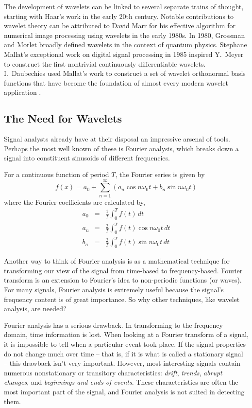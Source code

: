 \documentclass[a4paper,11pt]{article}
\begin{document}
The development of wavelets can be linked to several separate trains of thought, starting with Haar's work in the early 20th century. Notable contributions to wavelet theory can be attributed to David Marr for his effective algorithm for numerical image processing using wavelets in the early 1980s. In 1980, Grossman and Morlet broadly defined wavelets in the context of quantum physics. Stephane Mallat's exceptional work on digital signal processing in 1985 inspired Y.~Meyer to construct the first nontrivial continuously differentiable wavelets. I.~Daubechies used Mallat's work to construct a set of wavelet orthonormal basis functions that have become the foundation of almost every modern wavelet application \cite{amara}.

\subsection{The Need for Wavelets}
Signal analysts already have at their disposal an impressive arsenal of tools. Perhaps the most well known of these is Fourier analysis, which breaks down a signal into constituent sinusoids of different frequencies. 

For a continuous function of period $T$, the Fourier series is given by
\begin{equation}
f(x) = a_{0} + \sum_{n=1}^{\infty} \left( a_{n} \cos n\omega_{0}t + b_{n} \sin n\omega_{0}t \right)
\end{equation}
where the Fourier coefficients are calculated by,
\begin{eqnarray*}
a_{0} & = & \frac{1}{T} \int_{0}^{T} f(t)\,dt \\
a_{n} & = & \frac{2}{T} \int_{0}^{T} f(t) \cos n\omega_{0}t\,dt \\
b_{n} & = & \frac{2}{T} \int_{0}^{T} f(t) \sin n\omega_{0}t\,dt
\end{eqnarray*}

Another way to think of Fourier analysis is as a mathematical technique for transforming our view of the signal from time-based to frequency-based. Fourier transform is an extension to Fourier's idea to non-periodic functions (or waves). For many signals, Fourier analysis is extremely useful because the signal's frequency content is of great importance. So why other techniques, like wavelet analysis, are needed?
         
Fourier analysis has a serious drawback. In transforming to the frequency domain, time information is lost. When looking at a Fourier transform of a signal, it is impossible to tell when a particular event took place. If the signal properties do not change much over time -- that is, if it is what is called a stationary signal -- this drawback isn't very important. However, most interesting signals contain numerous nonstationary or transitory characteristics: \emph{drift}, \emph{trends}, \emph{abrupt changes}, and \emph{beginnings and ends of events}. These characteristics are often the most important part of the signal, and Fourier analysis is not suited in detecting them. 
\end{document}
